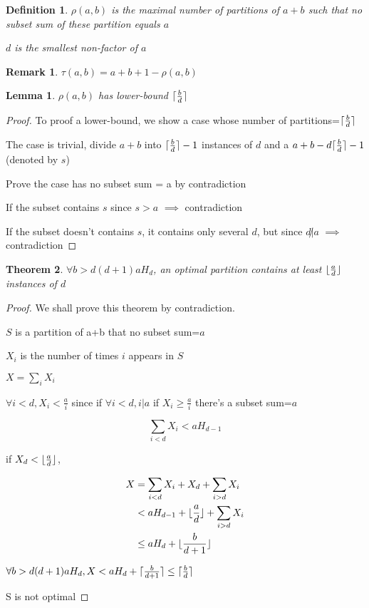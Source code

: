 \documentclass[12pt,a4paper]{article}
\title{}
\author{}
\DeclarePairedDelimiter\ceil{\lceil}{\rceil}
\DeclarePairedDelimiter\floor{\lfloor}{\rfloor}
\newtheorem{theorem}{Theorem}[section]
\newtheorem{lemma}[theorem]{Lemma}
\newtheorem{definition}{Definition}
\newtheorem*{remark}{Remark}
\begin{document}
\begin{definition}
$\rho(a,b)$ is the maximal number of partitions of $a+b$ such that no subset sum of these partition equals $a$

$d$ is the smallest non-factor of $a$
\end{definition}

\begin{remark}
$\tau(a,b)=a+b+1-\rho(a,b)$
\end{remark}

\begin{lemma}
$\rho(a,b)$ has lower-bound $\ceil{\frac{b}{d}}$
\end{lemma} 

\begin{proof}
To proof a lower-bound, we show a case whose number of partitions=$\ceil{\frac{b}{d}}$

The case is trivial, divide $a+b$ into $\ceil{\frac{b}{d}}-1$ instances of $d$ and a $a+b-d\ceil{\frac{b}{d}}-1$ (denoted by $s$)

Prove the case has no subset sum = a by contradiction

If the subset contains $s$ since $s>a$ $\implies$ contradiction

If the subset doesn't contains $s$, it contains only several $d$, but since $d\not| a$ $\implies$ contradiction
\end{proof}

\begin{theorem}
	$\forall b>d(d+1)aH_d$, an optimal partition contains at least $\floor{\frac{a}{d}}$ instances of $d$
\end{theorem}


\begin{proof}
    We shall prove this theorem by contradiction.  

    $S$ is a partition of a+b that no subset sum=$a$

    $X_i$ is the number of times $i$ appears in $S$

    $X = \sum_i{X_i}$

    $\forall i<d, X_i<\frac{a}{i}$ since if $\forall i<d, i|a$ if $X_i\geq \frac{a}{i}$ there's a subset sum=$a$

    \begin{equation}
        \sum_{i<d}{X_i}<aH_{d-1}
    \end{equation}

    if $X_d<\floor{\frac{a}{d}}$,

    \begin{align*}
        X&=\sum_{i<d}{X_i}+X_d+\sum_{i>d}{X_i}\\
         &<aH_{d-1}+\floor{\frac{a}{d}}+\sum_{i>d}{X_i}\\
         &\leq aH_d+\floor{\frac{b}{d+1}}
    \end{align*}

    $\forall b>d(d+1)aH_d, X<aH_d+\ceil{\frac{b}{d+1}}\leq \ceil{\frac{b}{d}}$

    S is not optimal
\end{proof}
\end{document}

